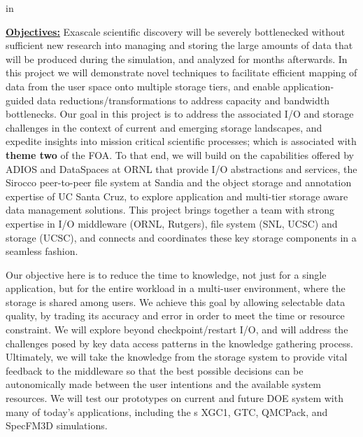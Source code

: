\documentclass[11pt,letterpaper]{article}
\begin{document}
\setlength{\parindent}{0.5cm}

 in


\underline{\textbf{Objectives:}} Exascale scientific discovery will be
severely bottlenecked without sufficient new research into managing and
storing the large amounts of data that will be produced during the
simulation, and analyzed for months afterwards. In this project we will
demonstrate novel techniques to  facilitate efficient mapping of data from
the user space onto multiple storage tiers, and enable application-guided
data reductions/transformations to address capacity and bandwidth
bottlenecks. 
Our goal in this project is
to address the associated I/O and storage challenges in the context of
current and emerging storage landscapes, and expedite insights into mission
critical scientific processes; which is associated with {\bf theme two} of the FOA. To that end, we will build on the
capabilities offered by ADIOS and DataSpaces at ORNL that provide I/O abstractions
and services, the Sirocco peer-to-peer file system at
Sandia and the object storage and annotation expertise of UC Santa Cruz, to
explore application and multi-tier storage aware data management
solutions.    This project
brings together a  team with strong expertise in I/O middleware (ORNL, Rutgers), file system (SNL, UCSC) and storage (UCSC), and connects and
coordinates these key storage components in a seamless fashion.

Our objective here is to reduce the time to knowledge, not just for a single
application, but for the entire workload in a multi-user environment, where
the storage is shared among users.
We achieve this goal by allowing selectable data quality, by trading its accuracy and error
in order to meet the time or resource constraint. 
We will explore beyond 
checkpoint/restart I/O, and will address the challenges posed by 
key
data access patterns in the knowledge gathering process.
Ultimately, we will take the knowledge from the storage system to provide vital feedback to the middleware 
so that the best possible decisions can be autonomically made between the user intentions and
the available system resources.  
We will test our prototypes  on current and future DOE system with many of today's applications, including the
s XGC1, GTC, QMCPack, and SpecFM3D simulations. 
\end{document}
